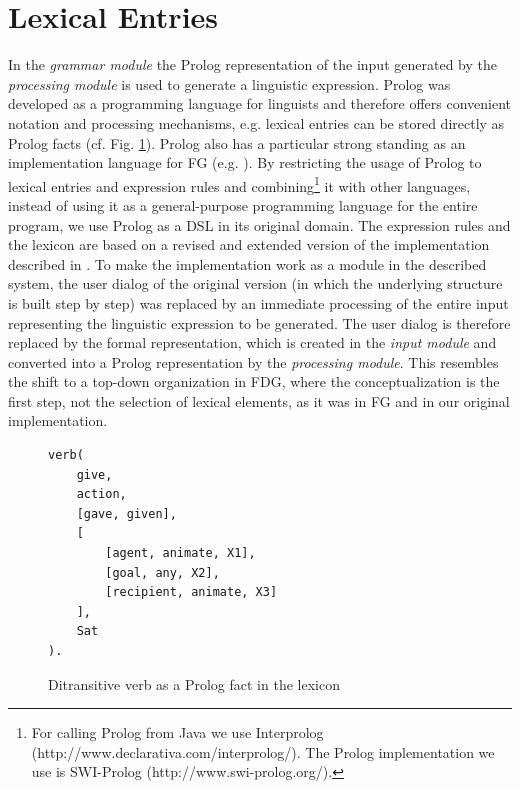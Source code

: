 \documentclass[a4paper, halfparskip, onecolumn, abstractoff, final]{scrartcl}
\begin{document}
\section{Lexical Entries}\label{lexical}

In the \emph{grammar module} the Prolog representation of the input generated by the \emph{processing module} is used to generate a linguistic expression. Prolog was developed as a programming language for linguists and therefore offers convenient notation and processing mechanisms, e.g. lexical entries can be stored directly as Prolog facts (cf. Fig. \ref{prolog-2}). Prolog also has a particular strong standing as an implementation language for FG (e.g. \citealt{Samuelsdorff1989,Dik1992}). By restricting the usage of Prolog to lexical entries and expression rules and combining\footnote{For calling Prolog from Java we use Interprolog (http://www.declarativa.com/interprolog/). The Prolog implementation we use is SWI-Prolog (http://www.swi-prolog.org/).} it with other languages, instead of using it as a general-purpose programming language for the entire program, we use Prolog as a DSL in its original domain. The expression rules and the lexicon are based on a revised and extended version of the implementation described in \cite{Samuelsdorff1989}. To make the implementation work as a module in the described system, the user dialog of the  original version (in which the underlying structure is built step by step) was replaced by an immediate processing of the entire input representing the linguistic expression to be generated. The user dialog is therefore replaced by the formal representation, which is created in the \emph{input module} and converted into a Prolog representation by the \emph{processing module}. This resembles the shift to a top-down organization \citep[668]{HengeveldAndMackenzie2006} in FDG, where the conceptualization is the first step, not the selection of lexical elements, as it was in FG and in our original implementation.

\begin{figure}
\begin{center}
\begin{verbatim}
verb(
    give, 
    action, 
    [gave, given], 
    [
        [agent, animate, X1], 
        [goal, any, X2],
        [recipient, animate, X3]
    ], 
    Sat
).
\end{verbatim}
\caption{Ditransitive verb as a Prolog fact in the lexicon} \label{prolog-2}
\end{center}
\end{figure}
\end{document}
